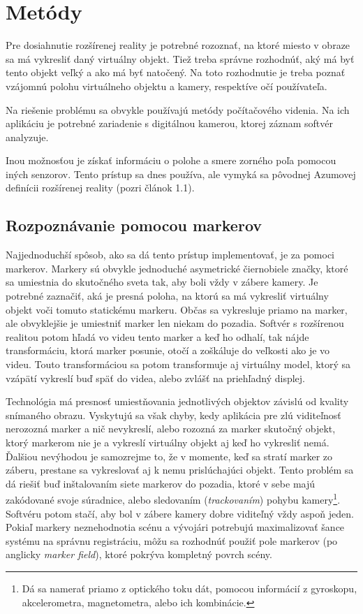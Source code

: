 \chapter{Metódy}

Pre dosiahnutie rozšírenej reality je potrebné rozoznať, na ktoré miesto v obraze sa má vykresliť daný virtuálny objekt. Tiež treba správne rozhodnúť, aký má byť tento objekt veľký a ako má byť natočený. Na toto rozhodnutie je treba poznať vzájomnú polohu virtuálneho objektu a kamery, respektíve očí používateľa.

Na riešenie problému sa obvykle používajú metódy počítačového videnia. Na ich aplikáciu je potrebné zariadenie s digitálnou kamerou, ktorej záznam softvér analyzuje.

Inou možnosťou je získať informáciu o polohe a smere zorného poľa pomocou iných senzorov. Tento prístup sa dnes používa, ale vymyká sa pôvodnej Azumovej definícii rozšírenej reality \cite{Azuma97} (pozri článok 1.1).

\section{Rozpoznávanie pomocou markerov}

Najjednoduchší spôsob, ako sa dá tento prístup implementovať, je za pomoci markerov. Markery sú obvykle jednoduché asymetrické čiernobiele značky, ktoré sa umiestnia do skutočného sveta tak, aby boli vždy v zábere kamery. Je potrebné zaznačiť, aká je presná poloha, na ktorú sa má vykresliť virtuálny objekt voči tomuto statickému markeru. Občas sa vykresluje priamo na marker, ale obvyklejšie je umiestniť marker len niekam do pozadia. Softvér s rozšírenou realitou potom hľadá vo videu tento marker a keď ho odhalí, tak nájde transformáciu, ktorá marker posunie, otočí a zoškáluje do veľkosti ako je vo videu. Touto transformáciou sa potom transformuje aj virtuálny model, ktorý sa vzápätí vykreslí buď späť do videa, alebo zvlášť na priehľadný displej.

Technológia má presnosť umiestňovania jednotlivých objektov závislú od kvality snímaného obrazu. Vyskytujú sa však chyby, kedy aplikácia pre zlú viditeľnosť nerozozná marker a nič nevykreslí, alebo rozozná za marker skutočný objekt, ktorý markerom nie je a vykreslí virtuálny objekt aj keď ho vykresliť nemá. Ďalšiou nevýhodou je samozrejme to, že v momente, keď sa stratí marker zo záberu, prestane sa vykreslovať aj k nemu prislúchajúci objekt. Tento problém sa dá riešiť buď inštalovaním siete markerov do pozadia, ktoré v sebe majú zakódované svoje súradnice, alebo sledovaním (\emph{trackovaním}) pohybu kamery\footnote{Dá sa namerať priamo z optického toku dát, pomocou informácií z gyroskopu, akcelerometra, magnetometra, alebo ich kombinácie.}. Softvéru potom stačí, aby bol v zábere kamery dobre viditeľný vždy aspoň jeden. Pokiaľ markery neznehodnotia scénu a vývojári potrebujú maximalizovať šance systému na správnu registráciu, môžu sa rozhodnúť použiť pole markerov (po anglicky \emph{marker field}), ktoré pokrýva kompletný povrch scény.

